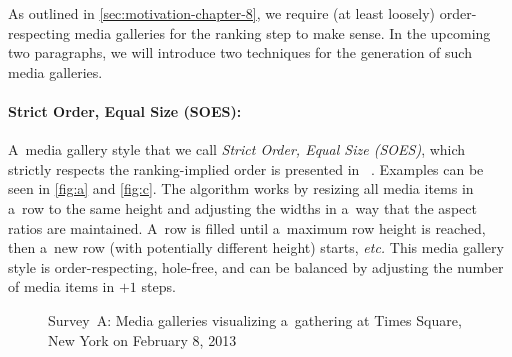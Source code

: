 As outlined in \autoref{sec:motivation-chapter-8},
we require (at least loosely) order-respecting media galleries
for the ranking step to make sense.
In the upcoming two paragraphs, we will introduce two techniques
for the generation of such media galleries.

\paragraph{Strict Order, Equal Size (SOES):}

A~media gallery style that we call \emph{Strict Order, Equal Size (SOES)},
which strictly respects the ranking-implied order is presented in~%
\cite{chedeau2012googleplus}.
Examples can be seen in \autoref{fig:a} and \autoref{fig:c}.
The algorithm works by resizing all media items in a~row to the same height
and adjusting the widths in a~way that the aspect ratios are maintained.
A~row is filled until a~maximum row height is reached,
then a~new row (with potentially different height) starts, \emph{etc.}
This media gallery style is order-respecting, hole-free,
and can be balanced by adjusting the number
of media items in $+1$ steps.

\begin{figure}[t!]
  \centering
  \caption[Survey~A: Media galleries visualizing a~gathering at Times Square]{Survey~A: Media galleries visualizing a~gathering at Times Square, New York on February 8, 2013}
  \label{fig:media-gallery1}  
\end{figure}

